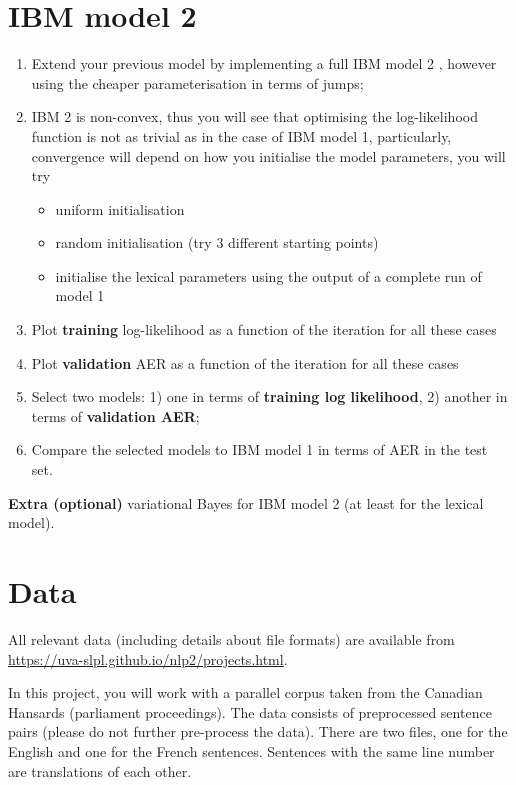 
\section{IBM model 2}

\begin{enumerate}
  \item Extend your previous model by implementing a full IBM model 2 \citep{Brown+1993:smt}, however using the cheaper parameterisation in terms of jumps;
  \item IBM 2 is non-convex, thus you will see that optimising the log-likelihood function is 
        not as trivial as in the case of IBM model 1, particularly, convergence will depend 
        on how you initialise the model parameters, you will try
  \begin{itemize}
    \item uniform initialisation
    \item random initialisation (try 3 different starting points)
    \item initialise the lexical parameters using the output of a complete run of model 1
  \end{itemize}
  \item Plot {\bf training} log-likelihood as a function of the iteration for all these cases
  \item Plot {\bf validation} AER as a function of the iteration for all these cases
  \item Select two models: 1) one in terms of {\bf training log likelihood}, 2) another in terms of {\bf validation AER};
  \item Compare the selected models to IBM model 1 in terms of AER in the test set.
\end{enumerate}

{\bf Extra (optional)} variational Bayes for IBM model 2 (at least for the lexical model).

\section{Data}

All relevant data (including details about file formats) are available from \url{https://uva-slpl.github.io/nlp2/projects.html}.

In this project, you will work with a parallel corpus taken from the Canadian Hansards (parliament proceedings). 
The data consists
of preprocessed sentence pairs (please do not further pre-process the data). There are two files, one for the
English and one for the French sentences. Sentences with the same line number are translations of each other.

